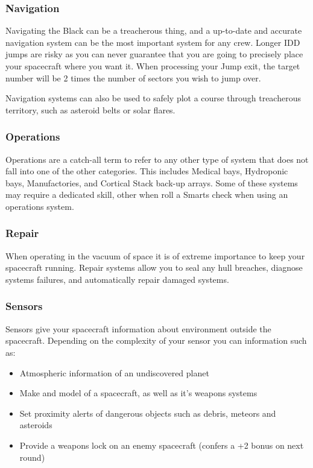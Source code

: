 \documentclass[10pt,twoside]{article}
\begin{document}
\begin{multicols}{2}
  \subsubsection{Navigation}
  
  Navigating the Black can be a treacherous thing, and a up-to-date and accurate navigation system can be the most important system for any crew. Longer IDD jumps are risky as you can never guarantee that you are going to precisely place your spacecraft where you want it. When processing your Jump exit, the target number will be 2 times the number of sectors you wish to jump over.
  
  Navigation systems can also be used to safely plot a course through treacherous territory, such as asteroid belts or solar flares.
  
  \subsubsection{Operations}
  
  Operations are a catch-all term to refer to any other type of system that does not fall into one of the other categories. This includes Medical bays, Hydroponic bays, Manufactories, and Cortical Stack back-up arrays. Some of these systems may require a dedicated skill, other when roll a Smarts check when using an operations system.
  
  \subsubsection{Repair}
  
  When operating in the vacuum of space it is of extreme importance to keep your spacecraft running. Repair systems allow you to seal any hull breaches, diagnose systems failures, and automatically repair damaged systems.
  
  \subsubsection{Sensors}
  
  Sensors give your spacecraft information about environment outside the spacecraft. Depending on the complexity of your sensor you can information such as:
  
  \begin{itemize}
    \item Atmospheric information of an undiscovered planet
    \item Make and model of a spacecraft, as well as it's weapons systems
    \item Set proximity alerts of dangerous objects such as debris, meteors and asteroids
    \item Provide a weapons lock on an enemy spacecraft (confers a +2 bonus on next round)
  \end{itemize}
  

\end{multicols}
\end{document}
